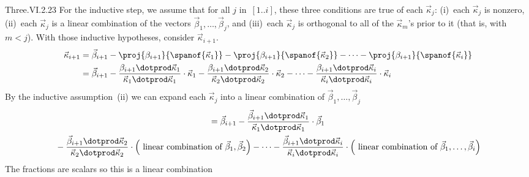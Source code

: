 \begin{ans}{Three.VI.2.23}
      For the inductive step, we assume that for all $j$ in~$[1..i]$,
      these three conditions are true of each $\vec{\kappa}_j$:
      (i)~each $\vec{\kappa}_j$ is nonzero,
      (ii)~each $\vec{\kappa}_j$ is a linear combination of
         the vectors $\vec{\beta}_1,\dots,\vec{\beta}_j$,
      and (iii)~each $\vec{\kappa}_j$ is orthogonal to all of the
         $\vec{\kappa}_m$'s prior to it (that is, with $m<j$).
      With those inductive hypotheses, consider $\vec{\kappa}_{i+1}$.
      \begin{align*}
        \vec{\kappa}_{i+1}
         &=
        \vec{\beta}_{i+1}
          -\proj{\beta_{i+1}}{\spanof{\vec{\kappa}_1}}
          -\proj{\beta_{i+1}}{\spanof{\vec{\kappa}_2}}
          -\dots
          -\proj{\beta_{i+1}}{\spanof{\vec{\kappa}_i}}  \\
         &=
        \vec{\beta}_{i+1}
          -\frac{\beta_{i+1}\dotprod\vec{\kappa}_1}{%
                  \vec{\kappa}_1\dotprod\vec{\kappa}_1}
              \cdot\vec{\kappa}_1
          -\frac{\beta_{i+1}\dotprod\vec{\kappa}_2}{%
                  \vec{\kappa}_2\dotprod\vec{\kappa}_2}
              \cdot\vec{\kappa}_2
          -\dots
          -\frac{\beta_{i+1}\dotprod\vec{\kappa}_i}{%
                  \vec{\kappa}_i\dotprod\vec{\kappa}_i}
              \cdot\vec{\kappa}_i
       \end{align*}
       By the inductive assumption~(ii) we can expand each $\vec{\kappa}_j$
       into a linear combination of $\vec{\beta}_1,\ldots,\vec{\beta}_j$
       \begin{multline*}
         =
        \vec{\beta}_{i+1}
          -\frac{\vec{\beta}_{i+1}\dotprod\vec{\kappa}_1}{%
                  \vec{\kappa}_1\dotprod\vec{\kappa}_1}
              \cdot\vec{\beta}_1                          \\
          \mbox{}-\frac{\vec{\beta}_{i+1}\dotprod\vec{\kappa}_2}{%
                  \vec{\kappa}_2\dotprod\vec{\kappa}_2}
              \cdot
                 \left(\text{
                   linear combination of $\vec{\beta}_1,\vec{\beta}_2$}
                 \right)
          -\dots
          -\frac{\vec{\beta}_{i+1}\dotprod\vec{\kappa}_i}{%
                  \vec{\kappa}_i\dotprod\vec{\kappa}_i}
              \cdot
                 \left(\text{
                   linear combination of $\vec{\beta}_1,\dots,\vec{\beta}_i$}
                 \right)
       \end{multline*}
       The fractions are scalars so this is a linear combination

\end{ans}
